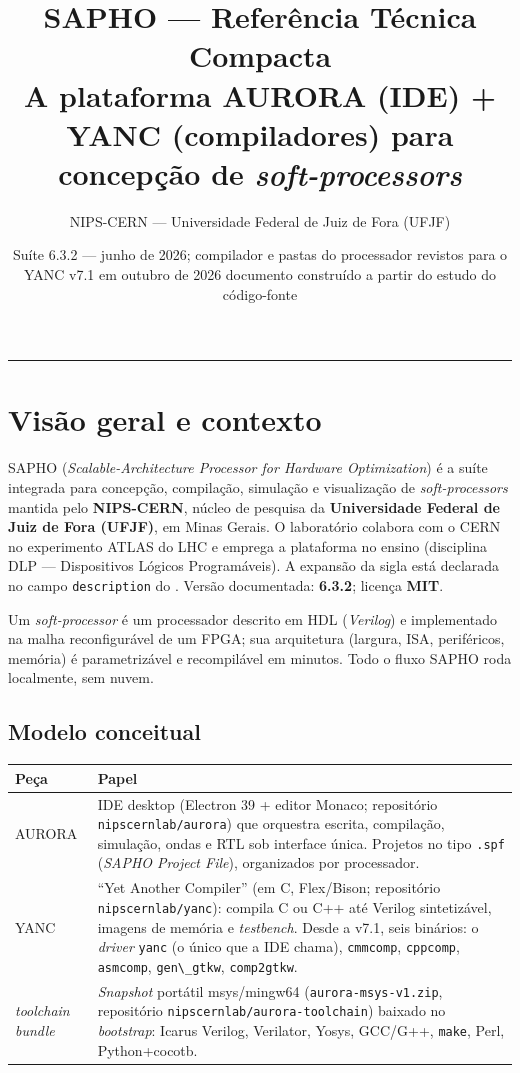 \documentclass[11pt,a4paper,oneside]{article}
\title{SAPHO --- Referência Técnica Compacta\\[2pt]
\normalsize\mdseries\color{auroraInk}A plataforma \textbf{AURORA} (IDE) + \textbf{YANC} (compiladores)
para concepção de \textit{soft-processors}}
\author{NIPS-CERN --- Universidade Federal de Juiz de Fora (UFJF)}
\date{Suíte 6.3.2 --- junho de 2026; compilador e pastas do processador revistos para o YANC v7.1 em outubro de 2026 \quad\textbar\quad documento construído a partir do estudo do código-fonte}
\newcommand{\cmm}{C\textpm{}}
\newcommand{\repo}[1]{\texttt{nipscernlab/#1}}
\newcommand{\file}[1]{\path{#1}}
\newcommand{\tool}[1]{\textsc{#1}}
\newcommand{\code}[1]{\lstinline[basicstyle=\ttfamily]|#1|}
\begin{document}
\maketitle
\thispagestyle{empty}
\vspace{-1.2em}

{\small\setlength{\parskip}{0pt}\tableofcontents}
\vspace{2pt}
\hrule
\vspace{4pt}

\section{Visão geral e contexto}
\label{sec:S01-visao-geral}

\tool{SAPHO} (\emph{Scalable-Architecture Processor for Hardware Optimization}) é a suíte
integrada para concepção, compilação, simulação e visualização de
\emph{soft-processors} mantida pelo \textbf{NIPS-CERN}, núcleo de pesquisa da
\textbf{Universidade Federal de Juiz de Fora (UFJF)}, em Minas Gerais. O
laboratório colabora com o CERN no experimento ATLAS do LHC e emprega a
plataforma no ensino (disciplina DLP --- Dispositivos Lógicos Programáveis). A
expansão da sigla está declarada no campo \code{description} do
\file{package.json}. Versão documentada: \textbf{6.3.2}; licença \textbf{MIT}.

Um \emph{soft-processor} é um processador descrito em HDL (\emph{Verilog}) e
implementado na malha reconfigurável de um FPGA; sua arquitetura (largura, ISA,
periféricos, memória) é parametrizável e recompilável em minutos. Todo o fluxo
\tool{SAPHO} roda localmente, sem nuvem.

\subsection{Modelo conceitual}

\begin{tabularx}{\linewidth}{l Y}
\toprule
\textbf{Peça} & \textbf{Papel} \\
\midrule
\tool{AURORA} & IDE desktop (Electron 39 + editor Monaco; repositório \repo{aurora}) que orquestra escrita, compilação, simulação, ondas e RTL sob interface única. Projetos no tipo \code{.spf} (\emph{SAPHO Project File}), organizados por processador. \\
\tool{YANC} & \enquote{Yet Another Compiler} (em C, Flex/Bison; repositório \repo{yanc}): compila \cmm{} ou C++ até Verilog sintetizável, imagens de memória e \emph{testbench}. Desde a v7.1, seis binários: o \emph{driver} \code{yanc} (o único que a IDE chama), \code{cmmcomp}, \code{cppcomp}, \code{asmcomp}, \code{gen\_gtkw}, \code{comp2gtkw}. \\
\emph{toolchain bundle} & \emph{Snapshot} portátil msys/mingw64 (\code{aurora-msys-v1.zip}, repositório \repo{aurora-toolchain}) baixado no \emph{bootstrap}: Icarus Verilog, Verilator, Yosys, GCC/G++, \code{make}, Perl, Python+cocotb. \\
\bottomrule
\end{tabularx}
\end{document}
